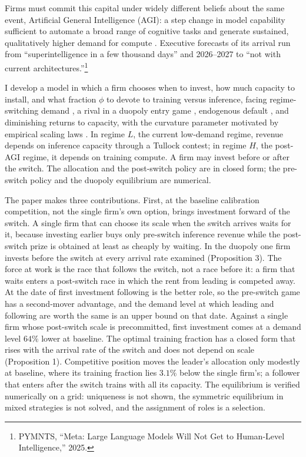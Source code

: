 \documentclass[
  11pt,
  letterpaper,
]{scrartcl}
\begin{document}
Firms must commit this capital under widely different beliefs about the
same event, Artificial General Intelligence (AGI): a step change in
model capability sufficient to automate a broad range of cognitive tasks
and generate sustained, qualitatively higher demand for compute
\citep{amodei2024machines}. Executive forecasts of its arrival run from
``superintelligence in a few thousand days''
\citep{altman2024intelligence} and 2026--2027 \citep{amodei2024machines}
to ``not with current architectures.''\footnote{PYMNTS, ``Meta: Large
  Language Models Will Not Get to Human-Level Intelligence,'' 2025.}

I develop a model in which a firm chooses when to invest, how much
capacity to install, and what fraction \(\phi\) to devote to training
versus inference, facing regime-switching demand
\citep{guo2005investment}, a rival in a duopoly entry game
\citep{grenadier2002option, huisman2015strategic}, endogenous default
\citep{leland1994corporate}, and diminishing returns to capacity, with
the curvature parameter motivated by empirical scaling laws
\citep{kaplan2020scaling, hoffmann2022training}. In regime \(L\), the
current low-demand regime, revenue depends on inference capacity through
a Tullock contest; in regime \(H\), the post-AGI regime, it depends on
training compute. A firm may invest before or after the switch. The
allocation and the post-switch policy are in closed form; the pre-switch
policy and the duopoly equilibrium are numerical.

The paper makes three contributions. First, at the baseline calibration
competition, not the single firm's own option, brings investment forward
of the switch. A single firm that can choose its scale when the switch
arrives waits for it, because investing earlier buys only pre-switch
inference revenue while the post-switch prize is obtained at least as
cheaply by waiting. In the duopoly one firm invests before the switch at
every arrival rate examined (Proposition 3). The force at work is the
race that follows the switch, not a race before it: a firm that waits
enters a post-switch race in which the rent from leading is competed
away. At the date of first investment following is the better role, so
the pre-switch game has a second-mover advantage, and the demand level
at which leading and following are worth the same is an upper bound on
that date. Against a single firm whose post-switch scale is
precommitted, first investment comes at a demand level \(64\%\) lower at
baseline. The optimal training fraction has a closed form that rises
with the arrival rate of the switch and does not depend on scale
(Proposition 1). Competitive position moves the leader's allocation only
modestly at baseline, where its training fraction lies \(3.1\%\) below
the single firm's; a follower that enters after the switch trains with
all its capacity. The equilibrium is verified numerically on a grid:
uniqueness is not shown, the symmetric equilibrium in mixed strategies
is not solved, and the assignment of roles is a selection.
\end{document}
